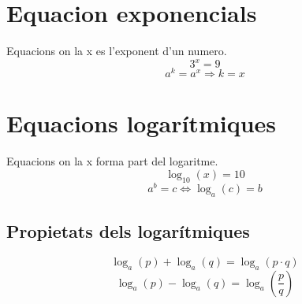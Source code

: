 \documentclass[12pt,a4paper]{article}
\begin{document}
\section{Equacion exponencials}
Equacions on la x es l'exponent d'un numero.
$$3^x=9$$
$$a^k=a^x \Rightarrow k=x$$
\section{Equacions logarítmiques}
Equacions on la x forma part del logaritme.
$$\log_{10}{(x)}=10$$
$$a^b=c \Longleftrightarrow \log_a{(c)}=b$$
\subsection{Propietats dels logarítmiques}
$$\log_a{(p)}+\log_a{(q)} = \log_a{(p\cdot q)}$$
$$\log_a{(p)}-\log_a{(q)} = \log_a{\left(\frac{p}{q}\right)}$$
\end{document}
